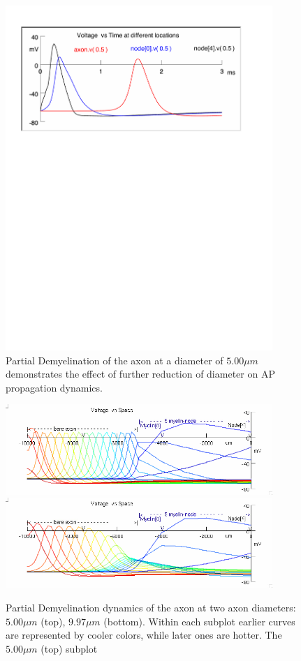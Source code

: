 \documentclass[12pt]{article}
\begin{document}
\begin{figure}[H]
\centering
\includegraphics[width=0.9\textwidth]{Results/4b-5}
\caption{\label{fig:P4b2} Partial Demyelination of the axon at a diameter of $5.00 \mu m$ demonstrates the effect of further reduction of diameter on AP propagation dynamics.}
\end{figure}

\begin{figure}[H]
\centering
\includegraphics[width=0.9\textwidth]{Results/Flattened/4b-5}
\includegraphics[width=0.9\textwidth]{Results/Flattened/4b-997}
\caption{\label{fig:P4b3} Partial Demyelination dynamics of the axon at two axon diameters: $5.00 \mu m$ (top), $9.97 \mu m$ (bottom). Within each subplot earlier curves are represented by cooler colors, while later ones are hotter. The $5.00 \mu m$ (top) subplot }
\end{figure}
\end{document}
